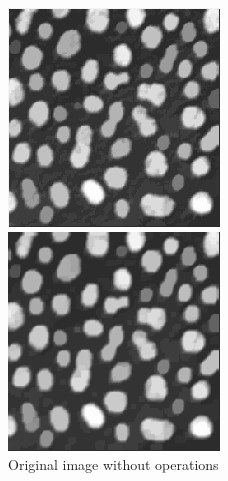\documentclass{article}
\begin{document}
\begin{figure}[!h]
  \includegraphics[width=\linewidth]{report/exam/images/immed_gray_inv_20051218_frgr4.jpg}
  \caption{Original image without operations}\label{fig:image-1}
\endminipage\hfill
{}
  \includegraphics[width=\linewidth]{report/exam/images/exercise_05a_output-01_1.png}

\end{figure}
\end{document}

